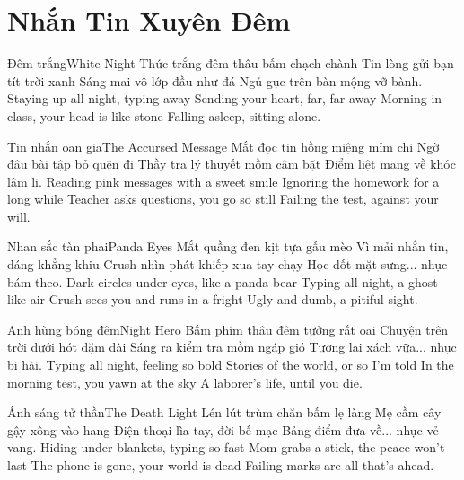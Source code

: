 \chapter{Nhắn Tin Xuyên Đêm}

\begin{tutuyetbox}{Đêm trắng}{White Night}
Thức trắng đêm thâu bấm chạch chành
Tin lòng gửi bạn tít trời xanh
Sáng mai vô lớp đầu như đá
Ngủ gục trên bàn mộng vỡ bành.
\tcblower
Staying up all night, typing away 
Sending your heart, far, far away 
Morning in class, your head is like stone 
Falling asleep, sitting alone.
\end{tutuyetbox}

\begin{tutuyetbox}{Tin nhắn oan gia}{The Accursed Message}
Mắt đọc tin hồng miệng mỉm chi
Ngờ đâu bài tập bỏ quên đi
Thầy tra lý thuyết mồm câm bặt
Điểm liệt mang về khóc lâm li.
\tcblower
Reading pink messages with a sweet smile 
Ignoring the homework for a long while 
Teacher asks questions, you go so still 
Failing the test, against your will.
\end{tutuyetbox}

\begin{tutuyetbox}{Nhan sắc tàn phai}{Panda Eyes}
Mắt quầng đen kịt tựa gấu mèo
Vì mải nhắn tin, dáng khẳng khiu
Crush nhìn phát khiếp xua tay chạy
Học dốt mặt sưng... nhục bám theo.
\tcblower
Dark circles under eyes, like a panda bear
Typing all night, a ghost-like air
Crush sees you and runs in a fright
Ugly and dumb, a pitiful sight.
\end{tutuyetbox}

\begin{tutuyetbox}{Anh hùng bóng đêm}{Night Hero}
Bấm phím thâu đêm tưởng rất oai
Chuyện trên trời dưới hót dặm dài
Sáng ra kiểm tra mồm ngáp gió
Tương lai xách vữa... nhục bi hài.
\tcblower
Typing all night, feeling so bold
Stories of the world, or so I'm told
In the morning test, you yawn at the sky
A laborer's life, until you die.
\end{tutuyetbox}

\begin{tutuyetbox}{Ánh sáng tử thần}{The Death Light}
Lén lút trùm chăn bấm lẹ làng
Mẹ cầm cây gậy xông vào hang
Điện thoại lìa tay, đời bế mạc
Bảng điểm đưa về... nhục vẻ vang.
\tcblower
Hiding under blankets, typing so fast
Mom grabs a stick, the peace won't last
The phone is gone, your world is dead
Failing marks are all that's ahead.
\end{tutuyetbox}

